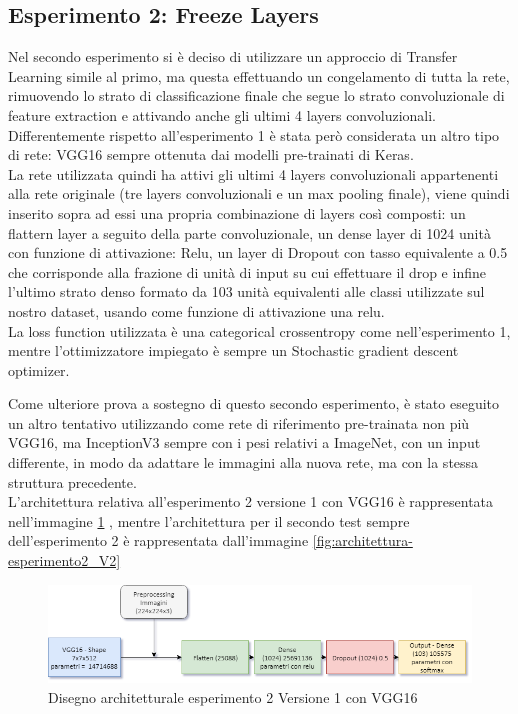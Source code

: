 \subsection{Esperimento 2: Freeze Layers}
Nel secondo esperimento si è deciso di utilizzare un approccio di Transfer Learning simile al primo, ma questa effettuando un congelamento di tutta la rete, rimuovendo lo strato di classificazione finale che segue lo strato convoluzionale di feature extraction e attivando anche gli ultimi 4 layers convoluzionali.
Differentemente rispetto all'esperimento 1 è stata però considerata un altro tipo di rete: VGG16 sempre ottenuta dai modelli pre-trainati di Keras. \\
La rete utilizzata quindi ha attivi gli ultimi 4 layers convoluzionali appartenenti alla rete originale (tre layers convoluzionali e un max pooling finale), viene quindi inserito sopra ad essi una propria combinazione di layers così composti: un flattern layer a seguito della parte convoluzionale, un dense layer di 1024 unità con funzione di attivazione: Relu, un layer di Dropout con tasso equivalente a 0.5 che corrisponde alla frazione di unità di input su cui effettuare il drop e infine l'ultimo strato denso formato da 103 unità equivalenti alle classi utilizzate sul nostro dataset, usando come funzione di attivazione una relu.\\
La loss function utilizzata è una categorical crossentropy come nell'esperimento 1, mentre l'ottimizzatore impiegato è sempre un Stochastic gradient descent optimizer. \bigskip

Come ulteriore prova a sostegno di questo secondo esperimento, è stato eseguito un altro tentativo utilizzando come rete di riferimento pre-trainata non più VGG16, ma InceptionV3 sempre con i pesi relativi a ImageNet, con un input differente, in modo da adattare le immagini alla nuova rete, ma con la stessa struttura precedente. \\
L'architettura relativa all'esperimento 2 versione 1 con VGG16 è rappresentata nell'immagine \ref{fig:architettura-esperimento2_V1} , mentre l'architettura per il secondo test sempre dell'esperimento 2 è rappresentata dall'immagine \ref{fig:architettura-esperimento2_V2}

\begin{figure}
    \centering
    \includegraphics[width=1\textwidth]{./resources/AdvanceMachineLearningSchema-Esperimento2_V1.png}
    \caption{Disegno architetturale esperimento 2 Versione 1 con VGG16} 
    \label{fig:architettura-esperimento2_V1}
\end{figure}

